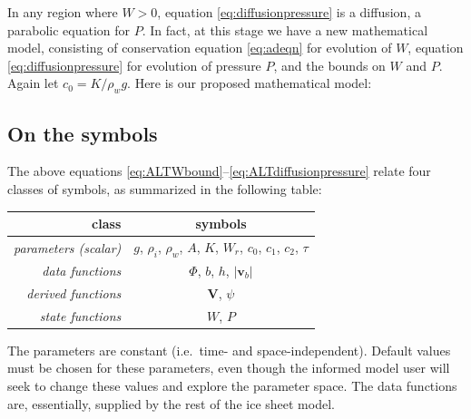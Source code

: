 \documentclass[12pt,final]{amsart}%
\newcommand*\mybluebox[1]{%
\colorbox{myblue}{\hspace{1em}#1\hspace{1em}}}
\newcommand\bv{\mathbf{v}}
\newcommand\bV{\mathbf{V}}
\newcommand{\Div}{\nabla\cdot}
\newcommand{\grad}{\nabla}
\begin{document}
In any region where $W>0$, equation \eqref{eq:diffusionpressure} is a diffusion, a parabolic equation for $P$.  In fact, at this stage we have a new mathematical model, consisting of conservation equation \eqref{eq:adeqn} for evolution of $W$, equation \eqref{eq:diffusionpressure} for evolution of pressure $P$, and the bounds on $W$ and $P$.  Again let $c_0 = K / \rho_w g$.  Here is our proposed mathematical model:


\subsection*{On the symbols}  The above equations \eqref{eq:ALTWbound}--\eqref{eq:ALTdiffusionpressure} relate four classes of symbols, as summarized in the following table:

\begin{table}[h]
\begin{tabular}{r|c}
class & symbols \\ \hline
\emph{parameters (scalar)} & $g$, $\rho_i$, $\rho_w$, $A$, $K$, $W_r$, $c_0$, $c_1$, $c_2$, $\tau$ \\
\emph{data functions} & $\Phi$, $b$, $h$, $|\bv_b|$ \\
\emph{derived functions} & $\bV$, $\psi$ \\
\emph{state functions} & $W$, $P$
\end{tabular}
\end{table}

\noindent The parameters are constant (i.e.~time- and space-independent).  Default values must be chosen for these parameters, even though the informed model user will seek to change these values and explore the parameter space.  The data functions are, essentially, supplied by the rest of the ice sheet model.
\end{document}

